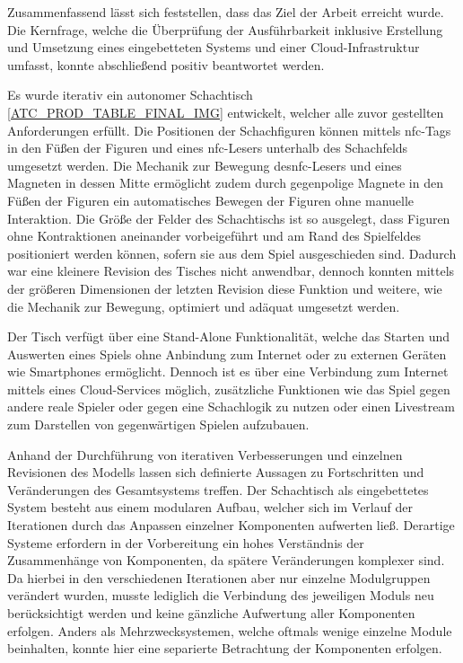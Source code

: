 Zusammenfassend lässt sich feststellen, dass das Ziel der Arbeit
erreicht wurde. Die Kernfrage, welche die Überprüfung der Ausführbarkeit
inklusive Erstellung und Umsetzung eines eingebetteten Systems und einer
Cloud-Infrastruktur umfasst, konnte abschließend positiv beantwortet
werden.

Es wurde iterativ ein autonomer Schachtisch
\ref{ATC_PROD_TABLE_FINAL_IMG} entwickelt, welcher alle zuvor gestellten
Anforderungen erfüllt. Die Positionen der Schachfiguren können mittels
\gls{nfc}-Tags in den Füßen der Figuren und eines \gls{nfc}-Lesers
unterhalb des Schachfelds umgesetzt werden. Die Mechanik zur Bewegung
des\gls{nfc}-Lesers und eines Magneten in dessen Mitte ermöglicht zudem
durch gegenpolige Magnete in den Füßen der Figuren ein automatisches
Bewegen der Figuren ohne manuelle Interaktion. Die Größe der Felder des
Schachtischs ist so ausgelegt, dass Figuren ohne Kontraktionen
aneinander vorbeigeführt und am Rand des Spielfeldes positioniert werden
können, sofern sie aus dem Spiel ausgeschieden sind. Dadurch war eine
kleinere Revision des Tisches nicht anwendbar, dennoch konnten mittels
der größeren Dimensionen der letzten Revision diese Funktion und
weitere, wie die Mechanik zur Bewegung, optimiert und adäquat umgesetzt
werden.

Der Tisch verfügt über eine Stand-Alone Funktionalität, welche das
Starten und Auswerten eines Spiels ohne Anbindung zum Internet oder zu
externen Geräten wie Smartphones ermöglicht. Dennoch ist es über eine
Verbindung zum Internet mittels eines Cloud-Services möglich,
zusätzliche Funktionen wie das Spiel gegen andere reale Spieler oder
gegen eine Schachlogik zu nutzen oder einen Livestream zum Darstellen
von gegenwärtigen Spielen aufzubauen.

Anhand der Durchführung von iterativen Verbesserungen und einzelnen
Revisionen des Modells lassen sich definierte Aussagen zu Fortschritten
und Veränderungen des Gesamtsystems treffen. Der Schachtisch als
eingebettetes System besteht aus einem modularen Aufbau, welcher sich im
Verlauf der Iterationen durch das Anpassen einzelner Komponenten
aufwerten ließ. Derartige Systeme erfordern in der Vorbereitung ein
hohes Verständnis der Zusammenhänge von Komponenten, da spätere
Veränderungen komplexer sind. Da hierbei in den verschiedenen
Iterationen aber nur einzelne Modulgruppen verändert wurden, musste
lediglich die Verbindung des jeweiligen Moduls neu berücksichtigt werden
und keine gänzliche Aufwertung aller Komponenten erfolgen. Anders als
Mehrzwecksystemen, welche oftmals wenige einzelne Module beinhalten,
konnte hier eine separierte Betrachtung der Komponenten erfolgen.

